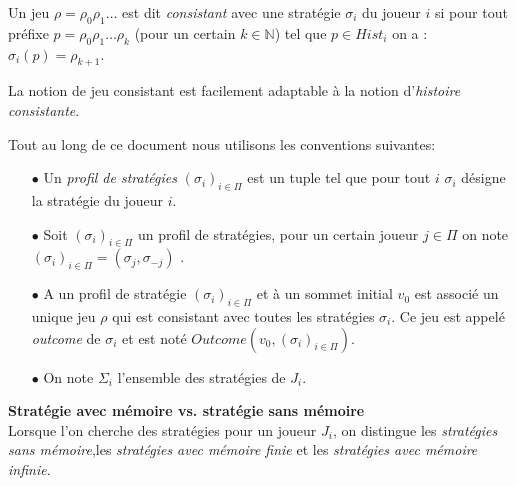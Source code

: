 \begin{defi}	
	Un jeu $\rho = \rho _{0}  \rho _{1} \ldots$ est dit \textit{consistant} avec une stratégie $\sigma _{i}$ du joueur $i$ si pour tout préfixe $p = \rho _{0}\rho _{1}\ldots \rho _{k}$ (pour un certain $k \in \mathbb{N}$) tel que $p \in Hist_{i}$ on a : $\sigma _{i}(p) = \rho_{k+1}$.	
\end{defi}

\begin{rem}
	La notion de jeu consistant est facilement adaptable à la notion d'\textit{histoire consistante}.
\end{rem}

\begin{notations}
	Tout au long de ce document nous utilisons les conventions suivantes:
	\begin{enumerate}
		\item[$\bullet$] Un \textit{profil de stratégies} $(\sigma _{i})_{i \in \Pi}$ est un tuple tel que pour tout $i$ $\sigma _{i}$ désigne la stratégie du 	joueur $i$. 
				
		\item[$\bullet$] Soit  $(\sigma _{i})_{i \in \Pi}$ un profil de stratégies, pour un certain joueur $j\in \Pi $ on note $(\sigma _{i})_{i \in \Pi} = ( \sigma _{j},\sigma _{-j})$ .
		
		\item[$\bullet$] A un profil de stratégie $(\sigma _{i})_{i \in \Pi}$ et à un sommet initial $v_{0}$ est associé un unique jeu $\rho$ qui est consistant avec toutes les stratégies $\sigma _{i}$. Ce jeu est appelé \textit{outcome} de $\sigma _{i}$ et est noté $Outcome(v_{0},(\sigma _{i})_{i\in \Pi})$.
		
		\item[$\bullet$] On note $\Sigma _{i}$ l'ensemble des stratégies de $J_{i}$.
		
	\end{enumerate}
\end{notations}
		



\noindent\textbf{Stratégie avec mémoire vs. stratégie sans mémoire}\\



Lorsque l'on cherche des stratégies pour un joueur $J_{i}$, on distingue les \textit{stratégies sans mémoire},les \textit{stratégies avec mémoire finie} et les \textit{stratégies avec mémoire infinie}.

